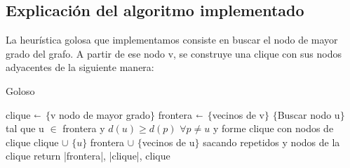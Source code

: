 \subsection{Explicación del algoritmo implementado}
La heurística golosa que implementamos consiste en buscar el nodo de mayor grado del grafo.
A partir de ese nodo v, se construye una clique con sus nodos adyacentes de la siguiente manera:

\begin{algorithm}[H]
\caption{Goloso}\label{ej2}
\begin{algorithmic}[1]
	\State clique  $\shortleftarrow$ $\{$v nodo de mayor grado$\}$
	\State frontera $\shortleftarrow$ $\{$vecinos de v$\}$
		\State $\{$Buscar nodo u$\}$ tal que u $\in$ frontera y $ d(u) \ge d(p)$ $ \forall p \neq u $ y forme clique con nodos de clique
		\State clique $\cup$ $\{u\}$
		\State frontera $\cup$ $\{$vecinos de u$\}$ sacando repetidos y nodos de la clique
	\EndWhile
	\State return |frontera|, |clique|, clique 
\EndProcedure
\end{algorithmic}
\end{algorithm}
